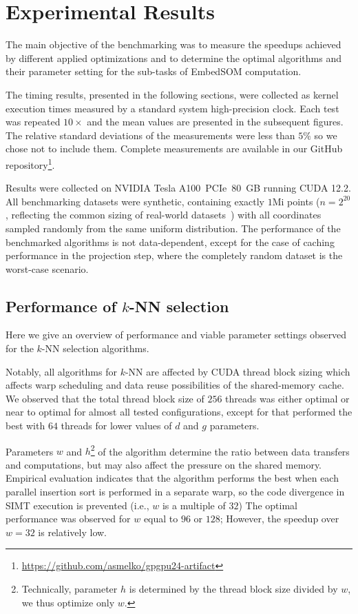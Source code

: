 \section{Experimental Results}\label{sec:results}

The main objective of the benchmarking was to measure the speedups achieved by different applied optimizations and to determine the optimal algorithms and their parameter setting for the sub-tasks of EmbedSOM computation.

The timing results, presented in the following sections, were collected as kernel execution times measured by a standard system high-precision clock. Each test was repeated $10\times$ and the mean values are presented in the subsequent figures. The relative standard deviations of the measurements were less than $5\%$ so we chose not to include them. Complete measurements are available in our GitHub repository\footnote{\url{https://github.com/asmelko/gpgpu24-artifact}}.

Results were collected on NVIDIA Tesla A100~PCIe~80~GB running CUDA 12.2. All benchmarking datasets were synthetic, containing exactly $1$Mi points ($n=2^{20}$, reflecting the common sizing of real-world datasets~\cite{adan2017flow}) with all coordinates sampled randomly from the same uniform distribution.
The performance of the benchmarked algorithms is not data-dependent, except for the case of caching performance in the projection step, where the completely random dataset is the worst-case scenario.


\subsection{Performance of $k$-NN selection}\label{sec:knn-evaluation}

Here we give an overview of performance and viable parameter settings observed for the $k$-NN selection algorithms.

Notably, all algorithms for $k$-NN are affected by CUDA thread block sizing which affects warp scheduling and data reuse possibilities of the shared-memory cache.
We observed that the total thread block size of $256$ threads was either optimal or near to optimal for almost all tested configurations, except for  that performed the best with $64$ threads for lower values of $d$ and $g$ parameters.

Parameters $w$ and $h$\footnote{Technically, parameter $h$ is determined by the thread block size divided by $w$, we thus optimize only $w$.} of the  algorithm determine the ratio between data transfers and computations, but may also affect the pressure on the shared memory.
Empirical evaluation indicates that the algorithm performs the best when each parallel insertion sort is performed in a separate warp, so the code divergence in SIMT execution is prevented (i.e., $w$ is a multiple of $32$)
The optimal performance was observed for $w$ equal to $96$ or $128$; However, the speedup over $w=32$ is relatively low.

